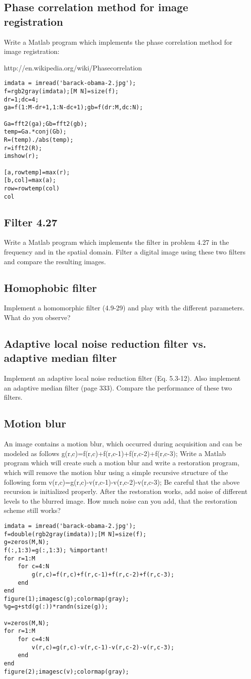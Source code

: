 \subsection{Phase correlation method for image registration}
Write a Matlab program which implements the phase correlation method for image
registration:

http://en.wikipedia.org/wiki/Phase\textunderscore correlation

\begin{lstlisting}
imdata = imread('barack-obama-2.jpg');
f=rgb2gray(imdata);[M N]=size(f);
dr=1;dc=4;
ga=f(1:M-dr+1,1:N-dc+1);gb=f(dr:M,dc:N);

Ga=fft2(ga);Gb=fft2(gb);
temp=Ga.*conj(Gb);
R=(temp)./abs(temp);
r=ifft2(R);
imshow(r);

[a,rowtemp]=max(r);
[b,col]=max(a);
row=rowtemp(col)
col
\end{lstlisting}
\subsection{Filter 4.27}
Write a Matlab program which implements the filter in problem 4.27 in the
frequency and in the spatial domain. Filter a digital image using these two filters and compare the resulting images.
\subsection{Homophobic filter}
Implement a homomorphic filter (4.9-29) and play with the different parameters.
What do you observe?
\subsection{Adaptive local noise reduction filter vs. adaptive median filter}
Implement an adaptive local noise reduction filter (Eq. 5.3-12). Also implement
an adaptive median filter (page 333). Compare the performance of these two filters.
\subsection{Motion blur}
An image contains a motion blur, which occurred during acquisition and can be modeled as follows g(r,c)=f(r,c)+f(r,c-1)+f(r,c-2)+f(r,c-3);
Write a Matlab program which will create such a motion blur and write a restoration program, which will remove the motion blur using a simple recursive structure of the following form  v(r,c)=g(r,c)-v(r,c-1)-v(r,c-2)-v(r,c-3);
Be careful that the above recursion is initialized properly. After the restoration works, add noise of different levels to the blurred image. How much noise can you add, that the restoration scheme still works?
\begin{lstlisting}
imdata = imread('barack-obama-2.jpg');
f=double(rgb2gray(imdata));[M N]=size(f);
g=zeros(M,N);
f(:,1:3)=g(:,1:3); %important!
for r=1:M
    for c=4:N
        g(r,c)=f(r,c)+f(r,c-1)+f(r,c-2)+f(r,c-3);
    end
end
figure(1);imagesc(g);colormap(gray);
%g=g+std(g(:))*randn(size(g));

v=zeros(M,N);
for r=1:M
    for c=4:N
        v(r,c)=g(r,c)-v(r,c-1)-v(r,c-2)-v(r,c-3);
    end
end
figure(2);imagesc(v);colormap(gray);
\end{lstlisting}
